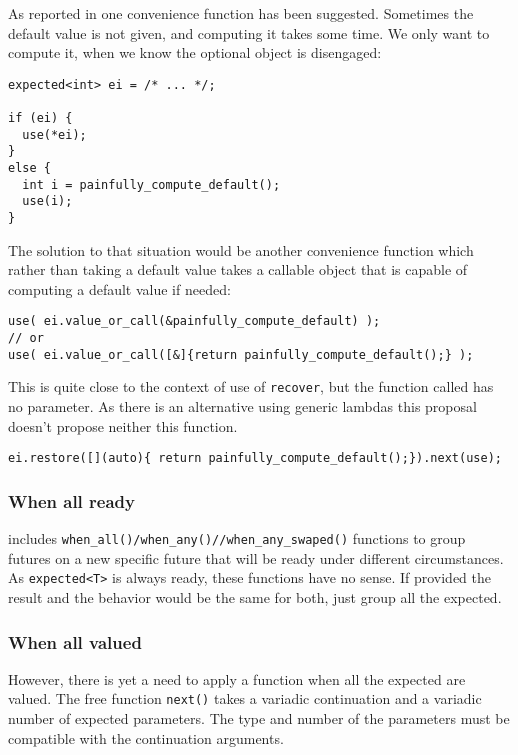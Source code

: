 \documentclass[a4paper,10pt]{article}
\newcommand{\cpp}[1]{\lstinline{#1}}
\begin{document}
As reported in \cite{OPTIONAL_R5} one  convenience function has been suggested. Sometimes the default value is not given, and computing it takes some time. We only want to compute it, when we know the optional object is disengaged:

\begin{lstlisting}
expected<int> ei = /* ... */;

if (ei) {
  use(*ei);
}
else {
  int i = painfully_compute_default();
  use(i);
}
\end{lstlisting}

The solution to that situation would be another convenience function which rather than taking a default value takes a callable object that is capable of computing a default value if needed:

\begin{lstlisting}
use( ei.value_or_call(&painfully_compute_default) );       
// or
use( ei.value_or_call([&]{return painfully_compute_default();} );
\end{lstlisting}

This is quite close to the context of use of  \cpp{recover}, but the function called has no parameter. As there is an alternative using generic lambdas this proposal doesn't propose neither this function.

\begin{lstlisting}
ei.restore([](auto){ return painfully_compute_default();}).next(use);       
\end{lstlisting}

\subsubsection{When all ready}

 \cite{ImprovementsAsync} includes \cpp{when_all()/when_any()//when_any_swaped()} functions to group futures on a new specific future that will be ready under different circumstances. As \cpp{expected<T>} is always ready, these functions have no sense. If provided the result and the behavior would be the same for both, just group all the expected.  
 
\subsubsection{When all valued}

However, there is yet a need to apply a function when all the expected are valued. The free function \cpp{next()} takes a variadic continuation and a variadic number of expected parameters. The type and number of the parameters must be compatible with the continuation arguments.
\end{document}
